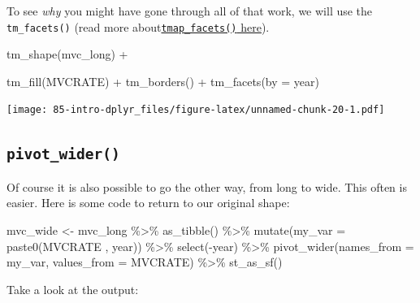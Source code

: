 \documentclass[
]{book}
\newenvironment{Shaded}{\begin{snugshade}}{\end{snugshade}}
\newcommand{\AttributeTok}[1]{\textcolor[rgb]{0.77,0.63,0.00}{#1}}
\newcommand{\FunctionTok}[1]{\textcolor[rgb]{0.00,0.00,0.00}{#1}}
\newcommand{\NormalTok}[1]{#1}
\newcommand{\OtherTok}[1]{\textcolor[rgb]{0.56,0.35,0.01}{#1}}
\newcommand{\SpecialCharTok}[1]{\textcolor[rgb]{0.00,0.00,0.00}{#1}}
\newcommand{\StringTok}[1]{\textcolor[rgb]{0.31,0.60,0.02}{#1}}
\begin{document}
To see \emph{why} you might have gone through all of that work, we will use the \texttt{tm\_facets()} (read more about\protect\hyperlink{tmap-facet}{\texttt{tmap\_facets()} here}).

\begin{Shaded}
\begin{Highlighting}[]
\FunctionTok{tm\_shape}\NormalTok{(mvc\_long) }\SpecialCharTok{+}
  
  \FunctionTok{tm\_fill}\NormalTok{(}\StringTok{\textquotesingle{}MVCRATE\textquotesingle{}}\NormalTok{) }\SpecialCharTok{+} 
  \FunctionTok{tm\_borders}\NormalTok{() }\SpecialCharTok{+}
\FunctionTok{tm\_facets}\NormalTok{(}\AttributeTok{by =} \StringTok{\textquotesingle{}year\textquotesingle{}}\NormalTok{)}
\end{Highlighting}
\end{Shaded}

\texttt{[image: 85-intro-dplyr\_files/figure-latex/unnamed-chunk-20-1.pdf]}

\hypertarget{pivot_wider}{%
\subsection{\texorpdfstring{\texttt{pivot\_wider()}}{pivot\_wider()}}\label{pivot_wider}}

Of course it is also possible to go the other way, from long to wide. This often is easier. Here is some code to return to our original shape:

\begin{Shaded}
\begin{Highlighting}[]
\NormalTok{mvc\_wide }\OtherTok{\textless{}{-}}\NormalTok{ mvc\_long }\SpecialCharTok{\%\textgreater{}\%}
  \FunctionTok{as\_tibble}\NormalTok{() }\SpecialCharTok{\%\textgreater{}\%}
  \FunctionTok{mutate}\NormalTok{(}\AttributeTok{my\_var =} \FunctionTok{paste0}\NormalTok{(}\StringTok{\textquotesingle{}MVCRATE \textquotesingle{}}\NormalTok{, year)) }\SpecialCharTok{\%\textgreater{}\%}
  \FunctionTok{select}\NormalTok{(}\SpecialCharTok{{-}}\NormalTok{year) }\SpecialCharTok{\%\textgreater{}\%}
  \FunctionTok{pivot\_wider}\NormalTok{(}\AttributeTok{names\_from =}\NormalTok{ my\_var,}
              \AttributeTok{values\_from =}\NormalTok{ MVCRATE) }\SpecialCharTok{\%\textgreater{}\%}
  \FunctionTok{st\_as\_sf}\NormalTok{()}
\end{Highlighting}
\end{Shaded}

Take a look at the output:
\end{document}
